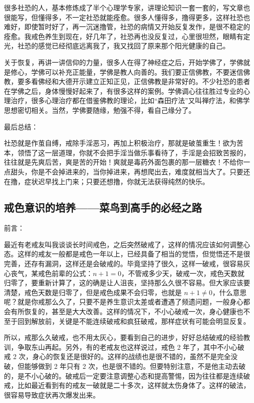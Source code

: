 很多社恐的人，基本修炼成了半个心理学专家，讲理论知识一套一套的，写文章也很能写，但懂得多，不一定社恐就能痊愈。很多人懂得多，撸得更多，这样社恐也难好，即使暂时好了，再一沉迷撸管，社恐的病情又开始反复发作，是很不稳定的痊愈。我戒色养生到现在，好几年了，社恐再也没反复过，心里很坦然，眼睛有定光，社恐的感觉已经彻底远离我了，我又找回了原来那个阳光健康的自己。

关于恢复，再讲一讲信仰的力量，很多人在得了神经症之后，开始学佛了，学佛就是修心，学佛可以补充正能量，学佛是教人向善的。我们要正信佛教，不要迷信佛教，要多看佛经和大德开示建立正知正见，正信佛教是非常好的。不少社恐的患者在学佛之后，身体慢慢好起来了，有很多这样的案例。学佛调心往往胜过专业的心理治疗，很多心理治疗都在借鉴佛教的理论，比如“森田疗法”又叫禅疗法，和佛学思想密切相关。当然，学佛要随缘，勉强不得，看自己缘分了。

最后总结：

社恐就是作茧自缚，戒除手淫恶习，再加上积极治疗，那就是破茧重生！欲为苦本，领悟了这一层道理，你就不会把手淫当做乐事看待了，手淫是会招致苦报的，往往就是先爽后苦，爽是苦的开始！爽就是毒药外面包裹的那一层糖衣！不给你一点甜头，你是不会掉进来的，当你掉进来，再想爬出去，难度就相当大了。只要还在撸，症状迟早找上门来；只要还想撸，你就无法获得纯然的快乐。

\subsection{戒色意识的培养——菜鸟到高手的必经之路}

前言：

最近有老戒友叫我谈谈长时间戒色，之后突然破戒了，这样的情况应该如何调整心态。这样的戒友一般都是戒色一年以上，已经具备了相当的觉悟，但觉悟还不是很完善，还存有漏洞，这样还是会破戒的。毕竟坚持了很久，这样一破戒，很容易灰心丧气，某戒色前辈的公式：$n + 1 = 0$，不管戒多少天，破戒一次，戒色天数就归零了，要重新计算了，这的确是让人沮丧，坚持那么久很不容易。但大家应该要清楚，戒色天数是归零了，但是戒色成果不会归零，也就是 $n + 1 \neq 0$，什么意思呢？就是你戒那么久了，只要不是养生意识太差或者遭遇了频遗问题，一般身心都会有所恢复的，甚至是大大改善。这样的情况下，不小心破戒一次，身心健康也不至于回到解放前，关键是不能连续破戒和疯狂破戒，那样症状有可能会明显反复。

所以，戒那么久破戒，也不用太灰心，要看到自己的进步，好好总结破戒的经验教训，争取东山再起。另外，有的老戒友也这样说过，戒色 2 年了，其中不小心破戒 2 次，身心的恢复还是很好的。这样的战绩也是很不错的，虽然不是完全没破，但能够做到 2 年只有 2 次，也是很不错的。但要特别注意，不是他主动去破的，是不小心破的。破戒后一定要注意调整心态和提高警惕，因为往往都是连续破戒，比如最近看到有的戒友一破就是二十多次，这样就太伤身体了。这样的破法，很容易导致症状再次爆发出来。

